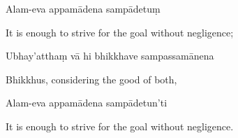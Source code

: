 Alam-eva appamādena sampādetuṃ

\begin{english}
  It is enough to strive for the goal without negligence;
\end{english}

Ubhay'atthaṃ vā hi bhikkhave sampassamānena

\begin{english}
  Bhikkhus, considering the good of both,
\end{english}

Alam-eva appamādena sampādetun'ti

\begin{english}
  It is enough to strive for the goal without negligence.
\end{english}
